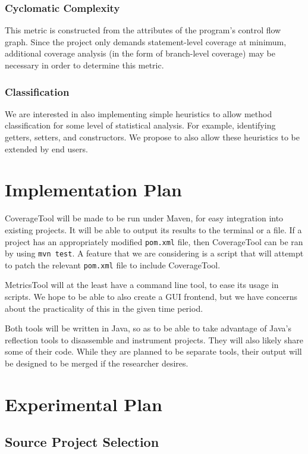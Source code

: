 \subsubsection{Cyclomatic Complexity}

This metric is constructed from the attributes of the program's control flow graph. Since the project only demands statement-level coverage at minimum, additional coverage analysis (in the form of branch-level coverage) may be necessary in order to determine this metric.

\subsubsection{Classification}

We are interested in also implementing simple heuristics to allow method classification for some level of statistical analysis. For example, identifying getters, setters, and constructors. We propose to also allow these heuristics to be extended by end users.

\section{Implementation Plan}
CoverageTool will be made to be run under Maven, for easy integration into existing projects. It will be able to output its results to the terminal or a file. If a project has an appropriately modified \texttt{pom.xml} file, then CoverageTool can be ran by using \texttt{mvn test}. A feature that we are considering is a script that will attempt to patch the relevant \texttt{pom.xml} file to include CoverageTool.

MetricsTool will at the least have a command line tool, to ease its usage in scripts. We hope to be able to also create a GUI frontend, but we have concerns about the practicality of this in the given time period.

Both tools will be written in Java, so as to be able to take advantage of Java's reflection tools to disassemble and instrument projects. They will also likely share some of their code. While they are planned to be separate tools, their output will be designed to be merged if the researcher desires.

\section{Experimental Plan}

\subsection{Source Project Selection}

